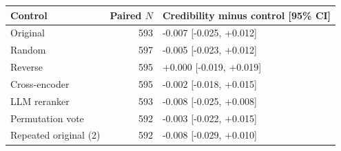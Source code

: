 \begin{tabular}{lrl}
\toprule
Control & Paired $N$ & Credibility minus control [95\% CI] \\
\midrule
Original & 593 & -0.007 [-0.025, +0.012] \\
Random & 597 & -0.005 [-0.023, +0.012] \\
Reverse & 595 & +0.000 [-0.019, +0.019] \\
Cross-encoder & 595 & -0.002 [-0.018, +0.015] \\
LLM reranker & 593 & -0.008 [-0.025, +0.008] \\
Permutation vote & 592 & -0.003 [-0.022, +0.015] \\
Repeated original (2) & 592 & -0.008 [-0.029, +0.010] \\
\bottomrule
\end{tabular}
